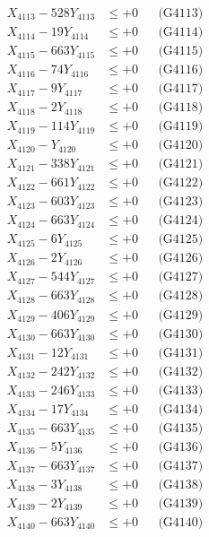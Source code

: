 \documentclass[a4paper,10pt]{article}
\begin{document}
{\begin{align}
X_{4113} - 528Y_{4113} &\leq +0 && \text{(G4113)} \\
X_{4114} - 19Y_{4114} &\leq +0 && \text{(G4114)} \\
X_{4115} - 663Y_{4115} &\leq +0 && \text{(G4115)} \\
X_{4116} - 74Y_{4116} &\leq +0 && \text{(G4116)} \\
X_{4117} - 9Y_{4117} &\leq +0 && \text{(G4117)} \\
X_{4118} - 2Y_{4118} &\leq +0 && \text{(G4118)} \\
X_{4119} - 114Y_{4119} &\leq +0 && \text{(G4119)} \\
X_{4120} - Y_{4120} &\leq +0 && \text{(G4120)} \\
\allowbreak
X_{4121} - 338Y_{4121} &\leq +0 && \text{(G4121)} \\
X_{4122} - 661Y_{4122} &\leq +0 && \text{(G4122)} \\
X_{4123} - 603Y_{4123} &\leq +0 && \text{(G4123)} \\
X_{4124} - 663Y_{4124} &\leq +0 && \text{(G4124)} \\
X_{4125} - 6Y_{4125} &\leq +0 && \text{(G4125)} \\
X_{4126} - 2Y_{4126} &\leq +0 && \text{(G4126)} \\
X_{4127} - 544Y_{4127} &\leq +0 && \text{(G4127)} \\
X_{4128} - 663Y_{4128} &\leq +0 && \text{(G4128)} \\
X_{4129} - 406Y_{4129} &\leq +0 && \text{(G4129)} \\
X_{4130} - 663Y_{4130} &\leq +0 && \text{(G4130)} \\
\allowbreak
X_{4131} - 12Y_{4131} &\leq +0 && \text{(G4131)} \\
X_{4132} - 242Y_{4132} &\leq +0 && \text{(G4132)} \\
X_{4133} - 246Y_{4133} &\leq +0 && \text{(G4133)} \\
X_{4134} - 17Y_{4134} &\leq +0 && \text{(G4134)} \\
X_{4135} - 663Y_{4135} &\leq +0 && \text{(G4135)} \\
X_{4136} - 5Y_{4136} &\leq +0 && \text{(G4136)} \\
X_{4137} - 663Y_{4137} &\leq +0 && \text{(G4137)} \\
X_{4138} - 3Y_{4138} &\leq +0 && \text{(G4138)} \\
X_{4139} - 2Y_{4139} &\leq +0 && \text{(G4139)} \\
X_{4140} - 663Y_{4140} &\leq +0 && \text{(G4140)} \\

\end{align}}
\end{document}
